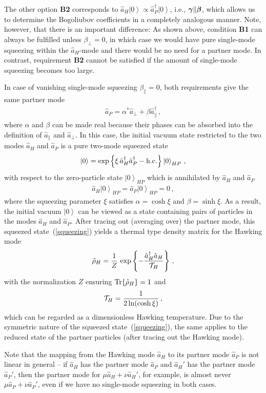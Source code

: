 \documentclass[aps,prd,showpacs,amssymb,nofootinbib,twocolumn]{revtex4}
\newcommand{\ket}[1]{\left|#1\right>}
\newcommand{\f}[1]{\mbox{\boldmath$#1$}}
\newcommand{\bea}{\begin{eqnarray}}
\newcommand{\ea}{\end{eqnarray}}
\begin{document}
The other option {\bf B2} corresponds to 
$\hat a_H\ket{0}\propto\hat a_P^\dagger\ket{0}$, i.e., 
$\f{\gamma}\|\f{\beta}$, which allows us to determine the 
Bogoliubov coefficients in a completely analogous manner.
%
Note, however, that there is an important difference:
%
As shown above, condition {\bf B1} can always be fulfilled unless 
\mbox{$\beta_\perp=0$}, in which case we would have pure 
single-mode squeezing within the $\hat a_H$-mode and there 
would be no need for a partner mode. 
%
In contrast, requirement {\bf B2} cannot be satisfied 
if the amount of single-mode squeezing becomes too large.  

In case of vanishing  single-mode squeezing $\beta_\|=0$, 
both requirements give the same partner mode
%
\bea
\hat a_P=\alpha^*\hat a_\perp+
\beta\hat a_\|^\dagger
\,,
\ea
%
where $\alpha$ and $\beta$ can be made real because their phases can 
be absorbed into the definition of $\hat a_\|$ and $\hat a_\perp$.
%
In this case, the initial vacuum state restricted to the two modes 
$\hat a_H$ and $\hat a_P$ is a pure two-mode squeezed state 
%
\bea
\label{squeezing}
\ket{0}=
\exp\left\{ \xi\, \hat a_H^\dagger \hat a_P^\dagger - {\rm h.c.} \right\}
\ket{0}_{HP}
\,,
\ea
%
with respect to the zero-particle state $\ket{0}_{HP}$ which is annihilated 
by $\hat a_H$ and $\hat a_P$ 
%
\bea
\hat a_H\ket{0}_{HP}=\hat a_P\ket{0}_{HP}=0
\,,
\ea
%
where the squeezing parameter $\xi$ satisfies $\alpha=\cosh\xi$ and 
$\beta=\sinh\xi$.
%
As a result, the initial vacuum $\ket{0}$ can be viewed as a state 
containing pairs of particles in the modes $\hat a_H$ and $\hat a_P$.
%
After tracing out (averaging over) the partner mode, this squeezed 
state~(\ref{squeezing}) yields a thermal type density matrix for the 
Hawking mode 
%
\bea
\hat\rho_H=
\frac{1}{Z}\,\exp\left\{- \frac{\hat a_H^\dagger\hat a_H}{{\cal T}_H}\right\}
\,,
\ea
%
with the normalization %
$Z$ ensuring ${\rm Tr}\{\hat\rho_H\}=1$
and 
%
\bea
{\cal T}_H=\frac{1}{2\ln(\cosh\xi)}
\,,
\ea
%
which can be regarded as a dimensionless Hawking temperature.  
%
Due to the symmetric nature of the squeezed state~(\ref{squeezing}),
the same applies to the reduced state of the partner particles 
(after tracing out the Hawking mode).

Note that the mapping from the Hawking mode $\hat a_H$ to its partner mode 
$\hat a_P$ is not linear in general -- if 
$\hat a_H$ has the partner mode $\hat a_P$ 
and 
$\hat a_H'$ has the partner mode $\hat a_P'$,
then the partner mode for $\mu\hat a_H+\nu\hat a_H'$, for example, 
is almost never $\mu\hat a_P+\nu\hat a_P'$, even if we have 
no single-mode squeezing in both cases.  
\end{document}
